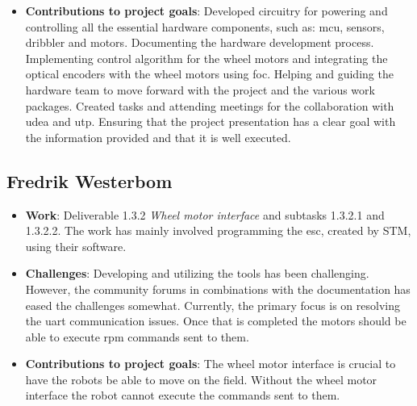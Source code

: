 \begin{itemize}
    \item \textbf{Contributions to project goals}: Developed circuitry for powering and controlling all the essential hardware components, such as: \ac{mcu}, sensors, dribbler and motors. Documenting the hardware development process. Implementing control algorithm for the wheel motors and integrating the optical encoders with the wheel motors using \ac{foc}. 
    Helping and guiding the hardware team to move forward with the project and the various work packages. Created tasks and attending meetings for the collaboration with \ac{udea} and \ac{utp}.
    Ensuring that the project presentation has a clear goal with the information provided and that it is well executed.
\end{itemize}
\subsection*{Fredrik Westerbom}
\begin{itemize}
    \item \textbf{Work}: Deliverable 1.3.2 \textit{Wheel motor interface} and subtasks 1.3.2.1 and 1.3.2.2. The work has mainly involved programming the \ac{esc}, created by STM, using their software.
    \item \textbf{Challenges}: Developing and utilizing the tools has been challenging. However, the community forums in combinations with the documentation has eased the challenges somewhat. Currently, the primary focus is on resolving the \ac{uart} communication issues. Once that is completed the motors should be able to execute \ac{rpm} commands sent to them.
    \item \textbf{Contributions to project goals}: The wheel motor interface is crucial to have the robots be able to move on the field. Without the wheel motor interface the robot cannot execute the commands sent to them.
\end{itemize}
